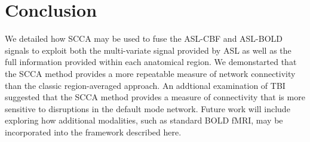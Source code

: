 \documentclass{llncs}
\begin{document}
\section{Conclusion}
We detailed how SCCA may be used to fuse the ASL-CBF and ASL-BOLD signals to exploit both the multi-variate signal provided by ASL as well as the full information provided within each anatomical region. We demonstarted that the SCCA method provides a more repeatable measure of network connectivity than the classic region-averaged approach. An addtional examination of TBI suggested that the SCCA method provides a measure of connectivity that is more sensitive to disruptions in the default mode network.  Future work will include exploring how additional modalities, such as standard BOLD fMRI, may be incorporated into the framework described here.



\end{document}
